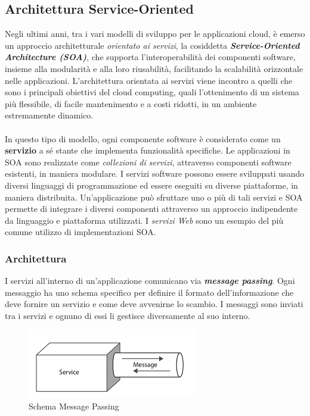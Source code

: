 \documentclass{article}
\begin{document}
\subsection{Architettura Service-Oriented}
Negli ultimi anni, tra i vari modelli di sviluppo per le applicazioni cloud, è emerso un approccio architetturale \textit{orientato ai servizi}, la cosiddetta \textbf{\textit{Service-Oriented Architecture (SOA)}}, che supporta l’interoperabilità dei componenti software, insieme alla modularità e alla loro riusabilità, facilitando la scalabilità orizzontale nelle applicazioni.
L’architettura orientata ai servizi viene incontro a quelli che sono i principali obiettivi del cloud computing, quali l’ottenimento di un sistema più flessibile, di facile mantenimento e a costi ridotti, in un ambiente estremamente dinamico.\\ \\In questo tipo di modello, ogni componente software è considerato come un \textbf{servizio} a sé stante che implementa funzionalità specifiche.
Le applicazioni in SOA sono realizzate come \textit{collezioni di servizi}, attraverso componenti software esistenti, in maniera modulare.
I servizi software possono essere sviluppati usando diversi linguaggi di programmazione ed essere eseguiti su diverse piattaforme, in maniera distribuita. Un’applicazione può sfruttare uno o più di tali servizi e SOA permette di integrare i diversi componenti attraverso un approccio indipendente da linguaggio e piattaforma utilizzati.
I \textit{servizi Web} sono un esempio del più comune utilizzo di implementazioni SOA.
\subsubsection{Architettura}
I servizi all’interno di un’applicazione comunicano via \textbf{\textit{message passing}}. 
Ogni messaggio ha uno schema specifico per definire il formato dell’informazione che deve fornire un servizio e come deve avvenirne lo scambio.
I messaggi sono inviati tra i servizi e ognuno di essi li gestisce diversamente al suo interno.

\begin{figure}[H]
\centering
\includegraphics{img/message_passing.png}
\caption{Schema Message Passing}
\end{figure}
\end{document}
